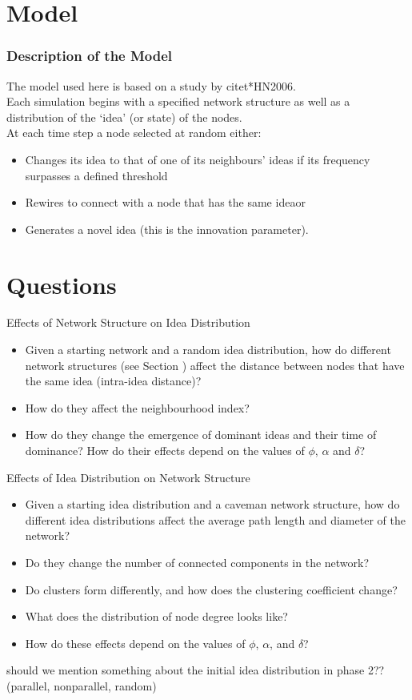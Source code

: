 \documentclass{beamer}
\begin{document}
\section{Model}
%
\begin{frame}
\frametitle{Description of the Model}

The model used here is based on a study by \alert{citet*{HN2006}}. \\
Each simulation begins with a specified network structure as well as a distribution of the `idea' (or state) of the nodes.\\ \pause
At each time step a node selected at random either: \pause
\begin{itemize}
\item Changes its idea to that of one of its neighbours' ideas if its frequency surpasses a defined threshold\pause
\item Rewires to connect with a node that has the same idea\pause or
\item Generates a novel idea (this is the innovation parameter). 
\end{itemize}
\end{frame}
%
\section{Questions}
\begin{frame}
{Effects of Network Structure on Idea Distribution}
\begin{itemize}
\item Given a starting network and a random idea distribution, how do different network structures (see Section ) affect the distance between nodes that have the same idea (intra-idea distance)? \pause
\item How do they affect the neighbourhood index? \pause
\item How do they change the emergence of dominant ideas and their time of dominance? How do their effects depend on the values of $\phi$, $\alpha$ and $\delta$?\pause
\end{itemize}
\end{frame}
%
\begin{frame}
{Effects of Idea Distribution on Network Structure}
\begin{itemize}
\item Given a starting idea distribution and a caveman network structure, how do different idea distributions affect the average path length and diameter of the network? \pause
\item Do they change the number of connected components in the network?\pause
\item Do clusters form differently, and how does the clustering coefficient change? \pause
\item What does the distribution of node degree looks like? \pause
\item How do these effects depend on the values of $\phi$, $\alpha$, and $\delta$?\pause
\end{itemize}
\alert{should we mention something about the initial idea distribution in phase 2?? (parallel, nonparallel, random)}
\end{frame}
\end{document}

